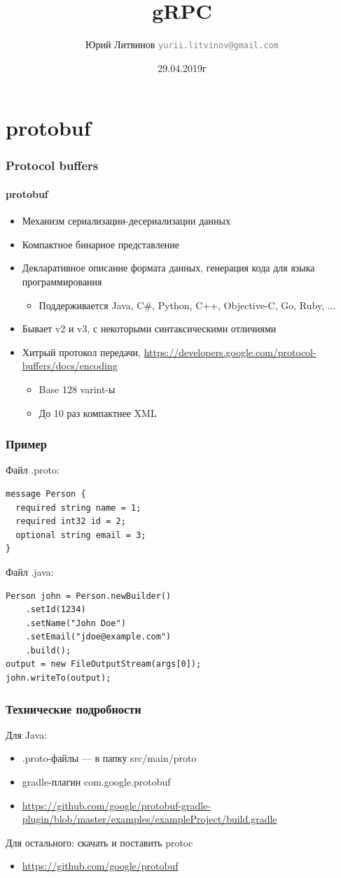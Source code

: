 \documentclass[xetex,mathserif,serif]{beamer}
\title{gRPC}
\author[Юрий Литвинов]{Юрий Литвинов \newline \textcolor{gray}{\small\texttt{yurii.litvinov@gmail.com}}}
\date{29.04.2019г}
\begin{document}
	
	\frame{\titlepage}

	\section{protobuf}

	\begin{frame}
		\frametitle{Protocol buffers}
		\framesubtitle{protobuf}
		\begin{itemize}
			\item Механизм сериализации-десериализации данных
			\item Компактное бинарное представление
			\item Декларативное описание формата данных, генерация кода для языка программирования
			\begin{itemize}
				\item Поддерживается Java, C\#, Python, C++, Objective-C, Go, Ruby, ...
			\end{itemize}
			\item Бывает v2 и v3, с некоторыми синтаксическими отличиями
			\item Хитрый протокол передачи, \url{https://developers.google.com/protocol-buffers/docs/encoding}
			\begin{itemize}
				\item Base 128 varint-ы
				\item До 10 раз компактнее XML 
			\end{itemize}
		\end{itemize}
	\end{frame}

	\begin{frame}[fragile]
		\frametitle{Пример}
		Файл .proto:
		\begin{verbatim}
message Person {
  required string name = 1;
  required int32 id = 2;
  optional string email = 3;
}
		\end{verbatim}
		Файл .java:
		\begin{verbatim}
Person john = Person.newBuilder()
    .setId(1234)
    .setName("John Doe")
    .setEmail("jdoe@example.com")
    .build();
output = new FileOutputStream(args[0]);
john.writeTo(output);
		\end{verbatim}
	\end{frame}

	\begin{frame}
		\frametitle{Технические подробности}
		Для Java:
		\begin{itemize}
			\item .proto-файлы --- в папку src/main/proto
			\item gradle-плагин com.google.protobuf
			\item \url{https://github.com/google/protobuf-gradle-plugin/blob/master/examples/exampleProject/build.gradle}
		\end{itemize}
		Для остального: скачать и поставить protoc
		\begin{itemize}
			\item \url{https://github.com/google/protobuf}
		\end{itemize}
	\end{frame}
\end{document}
